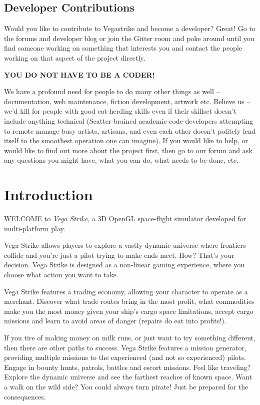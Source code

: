 \documentclass{article}
\begin{document}
\subsection{Developer Contributions}

Would you like to contribute to Vegastrike and become a developer? Great! Go to the forums and developer blog or join the Gitter room and poke around until you find someone working on something that interests you and contact the people working on that aspect of the project directly.

\textbf{YOU DO NOT HAVE TO BE A CODER!}

We have a profound need for people to do many other things as well -- documentation, web maintenance, fiction development, artwork etc. Believe us -- we'd kill for people with good cat-herding skills even if their skillset doesn't include anything technical (Scatter-brained academic code-developers attempting to remote manage busy artists, artisans, and even each other doesn't politely lend itself to the smoothest operation one can imagine). If you would like to help, or would like to find out more about the project first, then go to our forum and ask any questions you might have, what you can do, what needs to be done, etc. 

\section{Introduction}

WELCOME to \textit{Vega Strike}, a 3D OpenGL space-flight simulator developed for multi-platform play. 

Vega Strike allows players to explore a vastly dynamic universe where frontiers collide and you're just a pilot trying to make ends meet. How? That's your decision. Vega Strike is designed as a non-linear gaming experience, where you choose what action you want to take. 

Vega Strike features a trading economy, allowing your character to operate as a merchant. Discover what trade routes bring in the most profit, what commodities make you the most money given your ship's cargo space limitations, accept cargo missions and learn to avoid areas of danger (repairs do eat into profits!). 

If you tire of making money on milk runs, or just want to try something different, then there are other paths to success. Vega Strike features a mission generator, providing multiple missions to the experienced (and not so experienced) pilots. Engage in bounty hunts, patrols, battles and escort missions. Feel like traveling? Explore the dynamic universe and see the farthest reaches of known space. Want a walk on the wild side? You could always turn pirate! Just be prepared for the consequences. 
\end{document}
